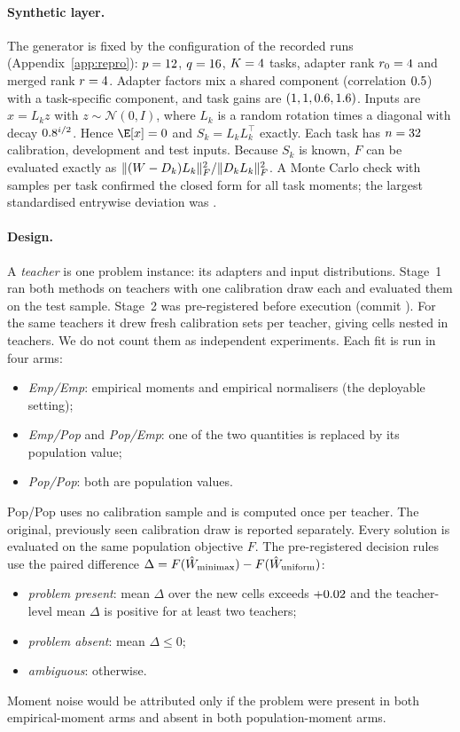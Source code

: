 \paragraph{Synthetic layer.} The generator is fixed by the configuration of the recorded runs
(Appendix~\ref{app:repro}): $p=12$, $q=16$, $K=4$ tasks, adapter rank
$r_0=4$ and merged rank $r=4$. Adapter factors mix a shared component (correlation
$0.5$) with a task-specific component, and task gains are $(1, 1, 0.6, 1.6)$. Inputs are $x=L_kz$
with $z\sim\mathcal N(0,I)$, where $L_k$ is a random rotation times a diagonal with decay
$0.8^{i/2}$. Hence $\E[x]=0$ and $S_k=L_kL_k^\top$ exactly. Each task has $n=32$
calibration, \CfgNdev{} development and \CfgNtest{} test inputs. Because $S_k$ is known, $F$ can
be evaluated exactly as $\lVert (W-D_k)L_k\rVert_{F}^2/\lVert D_kL_k\rVert_{F}^2$. A Monte Carlo check with
\CfgMCSamples{} samples per task confirmed the closed form for all \STwoMCN{} task moments; the
largest standardised entrywise deviation was \STwoMCWorstZ.

\paragraph{Design.} A \emph{teacher} is one problem instance: its adapters and input
distributions. Stage~1 ran both methods on \CfgNTeachers{} teachers with one calibration draw each
and evaluated them on the test sample. Stage~2 was pre-registered before execution (commit
\texttt{\STwoCommit}). For the same \CfgNTeachers{} teachers it drew \CfgNResamples{} fresh
calibration sets per teacher, giving \CfgNewCells{} cells nested in teachers. We do not count them
as \CfgNewCells{} independent experiments. Each fit is run in four arms:
\begin{itemize}
\item \emph{Emp/Emp}: empirical moments and empirical normalisers (the deployable setting);
\item \emph{Emp/Pop} and \emph{Pop/Emp}: one of the two quantities is replaced by its population
value;
\item \emph{Pop/Pop}: both are population values.
\end{itemize}
Pop/Pop uses no calibration sample and is computed once per teacher. The original, previously
seen calibration draw is reported separately. Every solution is evaluated on the same population
objective $F$. The pre-registered decision rules use the paired difference
$\Delta=F(\hat{W}_{\mathrm{minimax}})-F(\hat{W}_{\mathrm{uniform}})$:
\begin{itemize}
\item \emph{problem present}: mean $\Delta$ over the new cells exceeds $+0.02$ and the
teacher-level mean $\Delta$ is positive for at least two teachers;
\item \emph{problem absent}: mean $\Delta\le0$;
\item \emph{ambiguous}: otherwise.
\end{itemize}
Moment noise would be attributed only if the problem were present in both empirical-moment arms
and absent in both population-moment arms.
